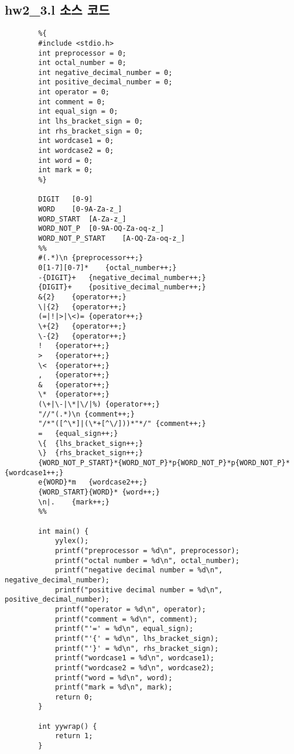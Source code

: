 \documentclass{article}
\begin{document}
\subsection{hw2\_3.l 소스 코드}
\begin{lstlisting}
		%{
		#include <stdio.h>
		int preprocessor = 0;
		int octal_number = 0;
		int negative_decimal_number = 0;
		int positive_decimal_number = 0;
		int operator = 0;
		int comment = 0;
		int equal_sign = 0;
		int lhs_bracket_sign = 0;
		int rhs_bracket_sign = 0;
		int wordcase1 = 0;
		int wordcase2 = 0;
		int word = 0;
		int mark = 0;
		%}
		
		DIGIT	[0-9]
		WORD	[0-9A-Za-z_]
		WORD_START	[A-Za-z_]
		WORD_NOT_P	[0-9A-OQ-Za-oq-z_]
		WORD_NOT_P_START	[A-OQ-Za-oq-z_]
		%%
		#(.*)\n	{preprocessor++;}
		0[1-7][0-7]*	{octal_number++;}
		-{DIGIT}+	{negative_decimal_number++;}
		{DIGIT}+	{positive_decimal_number++;}
		&{2}	{operator++;}
		\|{2}	{operator++;}
		(=|!|>|\<)=	{operator++;}
		\+{2}	{operator++;}
		\-{2}	{operator++;}
		!	{operator++;}
		>	{operator++;}
		\<	{operator++;}
		,	{operator++;}
		&	{operator++;}
		\*	{operator++;}
		(\+|\-|\*|\/|%)	{operator++;}
		"//"(.*)\n {comment++;}
		"/*"([^\*]|(\*+[^\/]))*"*/" {comment++;}
		=	{equal_sign++;}
		\{	{lhs_bracket_sign++;}
		\}	{rhs_bracket_sign++;}
		{WORD_NOT_P_START}*{WORD_NOT_P}*p{WORD_NOT_P}*p{WORD_NOT_P}*	{wordcase1++;}
		e{WORD}*m	{wordcase2++;}
		{WORD_START}{WORD}*	{word++;}
		\n|.	{mark++;}
		%%
		
		int main() {
			yylex();
			printf("preprocessor = %d\n", preprocessor);
			printf("octal number = %d\n", octal_number);
			printf("negative decimal number = %d\n", negative_decimal_number);
			printf("positive decimal number = %d\n", positive_decimal_number);
			printf("operator = %d\n", operator);
			printf("comment = %d\n", comment);
			printf("'=' = %d\n", equal_sign);
			printf("'{' = %d\n", lhs_bracket_sign);
			printf("'}' = %d\n", rhs_bracket_sign);
			printf("wordcase1 = %d\n", wordcase1);
			printf("wordcase2 = %d\n", wordcase2);
			printf("word = %d\n", word);
			printf("mark = %d\n", mark);
			return 0;
		}
		
		int yywrap() {
			return 1;
		}
		
\end{lstlisting}

\newpage
\end{document}
